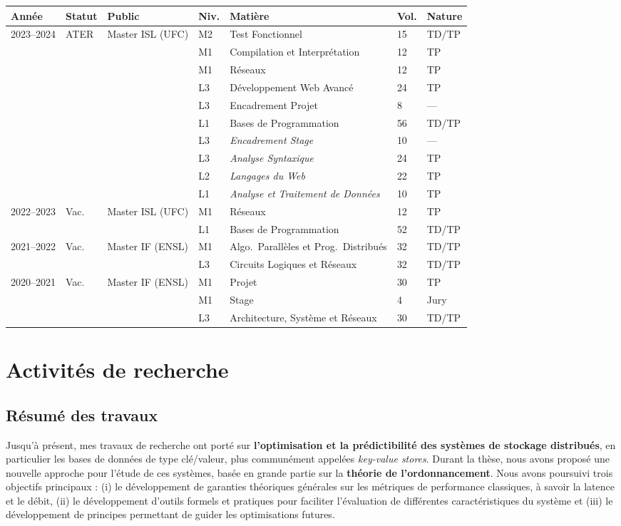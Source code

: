 \documentclass[12pt]{article}
\begin{document}
\begin{center}
    \footnotesize
    \begin{tabularx}{\linewidth}{p{2cm}lp{3cm}lXll}
        \toprule
        Année & Statut & Public & Niv. & Matière & Vol. & Nature \tabularnewline
        \midrule
        2023--2024 & ATER & Master ISL (UFC) & M2 & Test Fonctionnel & 15 & TD/TP \tabularnewline
        & & & M1 & Compilation et Interprétation & 12 & TP \tabularnewline
        & & & M1 & Réseaux & 12 & TP \tabularnewline
        & & & L3 & Développement Web Avancé & 24 & TP \tabularnewline
        & & & L3 & Encadrement Projet & 8 & --- \tabularnewline
        & & & L1 & Bases de Programmation & 56 & TD/TP \tabularnewline
        \cmidrule{4-7}
        & & & L3 & \emph{Encadrement Stage} & 10 & --- \tabularnewline
        & & & L3 & \emph{Analyse Syntaxique} & 24 & TP \tabularnewline
        & & & L2 & \emph{Langages du Web} & 22 & TP \tabularnewline
        & & & L1 & \emph{Analyse et Traitement de Données} & 10 & TP \tabularnewline
        \midrule
        2022--2023 & Vac. & Master ISL (UFC) & M1 & Réseaux & 12 & TP \tabularnewline
        & & & L1 & Bases de Programmation & 52 & TD/TP \tabularnewline
        \midrule
        2021--2022 & Vac. & Master IF (ENSL) & M1 & Algo.\ Parallèles et Prog.\ Distribués & 32 & TD/TP \tabularnewline
        & & & L3 & Circuits Logiques et Réseaux & 32 & TD/TP \tabularnewline
        \midrule
        2020--2021 & Vac. & Master IF (ENSL) & M1 & Projet & 30 & TP \tabularnewline
        & & & M1 & Stage & 4 & Jury \tabularnewline
        & & & L3 & Architecture, Système et Réseaux & 30 & TD/TP \tabularnewline
        \bottomrule
    \end{tabularx}
\end{center}

\section{Activités de recherche}

\subsection{Résumé des travaux}

Jusqu'à présent, mes travaux de recherche ont porté sur \textbf{l'optimisation et la prédictibilité
des systèmes de stockage distribués}, en particulier les bases de données de type clé/valeur, plus
communément appelées \emph{key-value stores}.  
Durant la thèse, nous avons proposé une nouvelle approche pour l'étude de ces systèmes, basée en
grande partie sur la \textbf{théorie de l'ordonnancement}.  
Nous avons poursuivi trois objectifs principaux : (i) le développement de garanties théoriques
générales sur les métriques de performance classiques, à savoir la latence et le débit, (ii) le
développement d'outils formels et pratiques pour faciliter l'évaluation de différentes
caractéristiques du système et (iii) le développement de principes permettant de guider les
optimisations futures.
\end{document}
